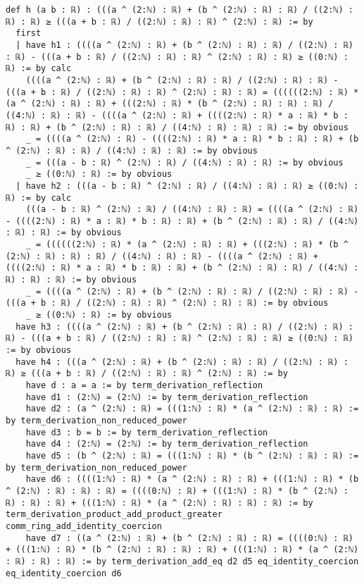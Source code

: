 \documentclass{article}
\begin{document}
\begin{tcolorbox}[colback=white!10, width=\linewidth]
\begin{lstlisting}[language=Lean4]
def h (a b : ℝ) : (((a ^ (2:ℕ) : ℝ) + (b ^ (2:ℕ) : ℝ) : ℝ) / ((2:ℕ) : ℝ) : ℝ) ≥ (((a + b : ℝ) / ((2:ℕ) : ℝ) : ℝ) ^ (2:ℕ) : ℝ) := by
  first
  | have h1 : ((((a ^ (2:ℕ) : ℝ) + (b ^ (2:ℕ) : ℝ) : ℝ) / ((2:ℕ) : ℝ) : ℝ) - (((a + b : ℝ) / ((2:ℕ) : ℝ) : ℝ) ^ (2:ℕ) : ℝ) : ℝ) ≥ ((0:ℕ) : ℝ) := by calc
    ((((a ^ (2:ℕ) : ℝ) + (b ^ (2:ℕ) : ℝ) : ℝ) / ((2:ℕ) : ℝ) : ℝ) - (((a + b : ℝ) / ((2:ℕ) : ℝ) : ℝ) ^ (2:ℕ) : ℝ) : ℝ) = ((((((2:ℕ) : ℝ) * (a ^ (2:ℕ) : ℝ) : ℝ) + (((2:ℕ) : ℝ) * (b ^ (2:ℕ) : ℝ) : ℝ) : ℝ) / ((4:ℕ) : ℝ) : ℝ) - ((((a ^ (2:ℕ) : ℝ) + ((((2:ℕ) : ℝ) * a : ℝ) * b : ℝ) : ℝ) + (b ^ (2:ℕ) : ℝ) : ℝ) / ((4:ℕ) : ℝ) : ℝ) : ℝ) := by obvious
    _ = ((((a ^ (2:ℕ) : ℝ) - ((((2:ℕ) : ℝ) * a : ℝ) * b : ℝ) : ℝ) + (b ^ (2:ℕ) : ℝ) : ℝ) / ((4:ℕ) : ℝ) : ℝ) := by obvious
    _ = (((a - b : ℝ) ^ (2:ℕ) : ℝ) / ((4:ℕ) : ℝ) : ℝ) := by obvious
    _ ≥ ((0:ℕ) : ℝ) := by obvious
  | have h2 : (((a - b : ℝ) ^ (2:ℕ) : ℝ) / ((4:ℕ) : ℝ) : ℝ) ≥ ((0:ℕ) : ℝ) := by calc
    (((a - b : ℝ) ^ (2:ℕ) : ℝ) / ((4:ℕ) : ℝ) : ℝ) = ((((a ^ (2:ℕ) : ℝ) - ((((2:ℕ) : ℝ) * a : ℝ) * b : ℝ) : ℝ) + (b ^ (2:ℕ) : ℝ) : ℝ) / ((4:ℕ) : ℝ) : ℝ) := by obvious
    _ = ((((((2:ℕ) : ℝ) * (a ^ (2:ℕ) : ℝ) : ℝ) + (((2:ℕ) : ℝ) * (b ^ (2:ℕ) : ℝ) : ℝ) : ℝ) / ((4:ℕ) : ℝ) : ℝ) - ((((a ^ (2:ℕ) : ℝ) + ((((2:ℕ) : ℝ) * a : ℝ) * b : ℝ) : ℝ) + (b ^ (2:ℕ) : ℝ) : ℝ) / ((4:ℕ) : ℝ) : ℝ) : ℝ) := by obvious
    _ = ((((a ^ (2:ℕ) : ℝ) + (b ^ (2:ℕ) : ℝ) : ℝ) / ((2:ℕ) : ℝ) : ℝ) - (((a + b : ℝ) / ((2:ℕ) : ℝ) : ℝ) ^ (2:ℕ) : ℝ) : ℝ) := by obvious
    _ ≥ ((0:ℕ) : ℝ) := by obvious
  have h3 : ((((a ^ (2:ℕ) : ℝ) + (b ^ (2:ℕ) : ℝ) : ℝ) / ((2:ℕ) : ℝ) : ℝ) - (((a + b : ℝ) / ((2:ℕ) : ℝ) : ℝ) ^ (2:ℕ) : ℝ) : ℝ) ≥ ((0:ℕ) : ℝ) := by obvious
  have h4 : (((a ^ (2:ℕ) : ℝ) + (b ^ (2:ℕ) : ℝ) : ℝ) / ((2:ℕ) : ℝ) : ℝ) ≥ (((a + b : ℝ) / ((2:ℕ) : ℝ) : ℝ) ^ (2:ℕ) : ℝ) := by
    have d : a = a := by term_derivation_reflection
    have d1 : (2:ℕ) = (2:ℕ) := by term_derivation_reflection
    have d2 : (a ^ (2:ℕ) : ℝ) = (((1:ℕ) : ℝ) * (a ^ (2:ℕ) : ℝ) : ℝ) := by term_derivation_non_reduced_power
    have d3 : b = b := by term_derivation_reflection
    have d4 : (2:ℕ) = (2:ℕ) := by term_derivation_reflection
    have d5 : (b ^ (2:ℕ) : ℝ) = (((1:ℕ) : ℝ) * (b ^ (2:ℕ) : ℝ) : ℝ) := by term_derivation_non_reduced_power
    have d6 : ((((1:ℕ) : ℝ) * (a ^ (2:ℕ) : ℝ) : ℝ) + (((1:ℕ) : ℝ) * (b ^ (2:ℕ) : ℝ) : ℝ) : ℝ) = ((((0:ℕ) : ℝ) + (((1:ℕ) : ℝ) * (b ^ (2:ℕ) : ℝ) : ℝ) : ℝ) + (((1:ℕ) : ℝ) * (a ^ (2:ℕ) : ℝ) : ℝ) : ℝ) := by term_derivation_product_add_product_greater comm_ring_add_identity_coercion
    have d7 : ((a ^ (2:ℕ) : ℝ) + (b ^ (2:ℕ) : ℝ) : ℝ) = ((((0:ℕ) : ℝ) + (((1:ℕ) : ℝ) * (b ^ (2:ℕ) : ℝ) : ℝ) : ℝ) + (((1:ℕ) : ℝ) * (a ^ (2:ℕ) : ℝ) : ℝ) : ℝ) := by term_derivation_add_eq d2 d5 eq_identity_coercion eq_identity_coercion d6

\end{lstlisting}
\end{tcolorbox}
\end{document}
